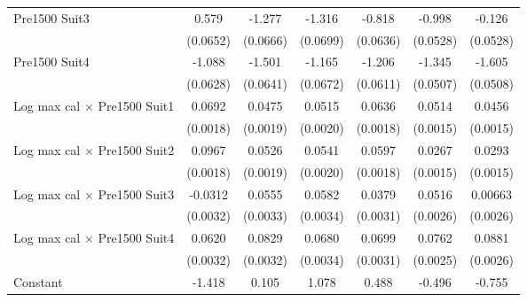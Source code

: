 {\begin{tabular}{l*{6}{c}}
\addlinespace
Pre1500 Suit3       &       0.579\sym{***}&      -1.277\sym{***}&      -1.316\sym{***}&      -0.818\sym{***}&      -0.998\sym{***}&      -0.126\sym{*}  \\
                    &    (0.0652)         &    (0.0666)         &    (0.0699)         &    (0.0636)         &    (0.0528)         &    (0.0528)         \\
\addlinespace
Pre1500 Suit4       &      -1.088\sym{***}&      -1.501\sym{***}&      -1.165\sym{***}&      -1.206\sym{***}&      -1.345\sym{***}&      -1.605\sym{***}\\
                    &    (0.0628)         &    (0.0641)         &    (0.0672)         &    (0.0611)         &    (0.0507)         &    (0.0508)         \\
\addlinespace
Log max cal $\times$ Pre1500 Suit1&      0.0692\sym{***}&      0.0475\sym{***}&      0.0515\sym{***}&      0.0636\sym{***}&      0.0514\sym{***}&      0.0456\sym{***}\\
                    &    (0.0018)         &    (0.0019)         &    (0.0020)         &    (0.0018)         &    (0.0015)         &    (0.0015)         \\
\addlinespace
Log max cal $\times$ Pre1500 Suit2&      0.0967\sym{***}&      0.0526\sym{***}&      0.0541\sym{***}&      0.0597\sym{***}&      0.0267\sym{***}&      0.0293\sym{***}\\
                    &    (0.0018)         &    (0.0019)         &    (0.0020)         &    (0.0018)         &    (0.0015)         &    (0.0015)         \\
\addlinespace
Log max cal $\times$ Pre1500 Suit3&     -0.0312\sym{***}&      0.0555\sym{***}&      0.0582\sym{***}&      0.0379\sym{***}&      0.0516\sym{***}&     0.00663\sym{*}  \\
                    &    (0.0032)         &    (0.0033)         &    (0.0034)         &    (0.0031)         &    (0.0026)         &    (0.0026)         \\
\addlinespace
Log max cal $\times$ Pre1500 Suit4&      0.0620\sym{***}&      0.0829\sym{***}&      0.0680\sym{***}&      0.0699\sym{***}&      0.0762\sym{***}&      0.0881\sym{***}\\
                    &    (0.0032)         &    (0.0032)         &    (0.0034)         &    (0.0031)         &    (0.0025)         &    (0.0026)         \\
\addlinespace
Constant            &      -1.418\sym{***}&       0.105         &       1.078\sym{***}&       0.488         &      -0.496\sym{*}  &      -0.755\sym{***}\\

\end{tabular}}
